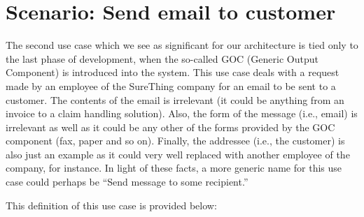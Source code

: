 \section{Scenario: Send email to customer}

The second use case which we see as significant for our architecture is tied only to the last phase of development,
when the so-called GOC (Generic Output Component) is introduced into the system. This use case deals with
a request made by an employee of the SureThing company for an email to be sent to a customer. The contents
of the email is irrelevant (it could be anything from an invoice to a claim handling solution). Also, the form
of the message (i.e., email) is irrelevant as well as it could be any other of the forms provided by the GOC
component (fax, paper and so on). Finally, the addressee (i.e., the customer) is also just an example as it could
very well replaced with another employee of the company, for instance. In light of these facts, a more generic
name for this use case could perhaps be ``Send message to some recipient.''

This definition of this use case is provided below:
\begin{center}
\end{center}

